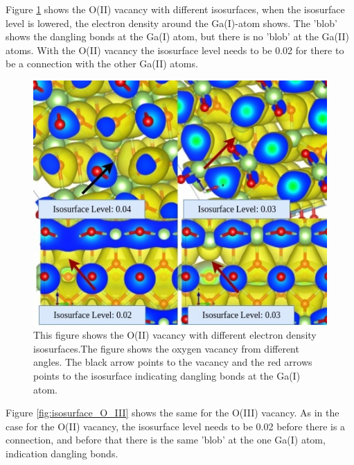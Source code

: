 Figure \ref{fig:isosurface_O_II} shows the O(II) vacancy with different isosurfaces, when the isosurface level is lowered, the electron density around the Ga(I)-atom shows. The 'blob' shows the dangling bonds at the Ga(I) atom, but there is no 'blob' at the Ga(II) atoms. With the O(II) vacancy the isosurface level needs to be 0.02 for there to be a connection with the other Ga(II) atoms.

\begin{figure}[H]
\includegraphics[width=\linewidth]{../fig/isosurfaces/O_II/isosurface}\caption{This figure shows the O(II) vacancy with different electron density isosurfaces.The figure shows the oxygen vacancy from different angles. The black arrow points to the vacancy and the red arrows points to the isosurface indicating dangling bonds at the Ga(I) atom.}\label{fig:isosurface_O_II}
\end{figure}

Figure \ref{fig:isosurface_O_III} shows the same for the O(III) vacancy. As in the case for the O(II) vacancy, the isosurface level needs to be 0.02 before there is a connection, and before that there is the same 'blob' at the one Ga(I) atom, indication dangling bonds.

